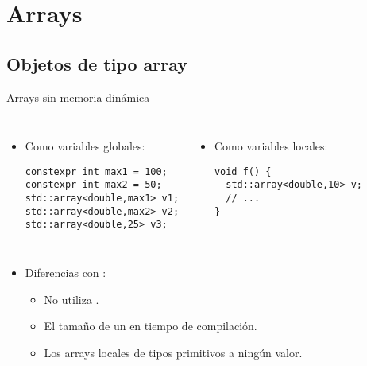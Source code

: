 \section{Arrays}

\subsection{Objetos de tipo array}

\begin{frame}[t,fragile]{Arrays sin memoria dinámica}
\begin{columns}[T]
\begin{itemize}
  \item Como variables globales:
\begin{lstlisting}
constexpr int max1 = 100;
constexpr int max2 = 50;
std::array<double,max1> v1;
std::array<double,max2> v2;
std::array<double,25> v3;
\end{lstlisting}
\end{itemize}

\begin{itemize}
  \item Como variables locales:
\begin{lstlisting}
void f() {
  std::array<double,10> v;
  // ...
}
\end{lstlisting}
\end{itemize}

\end{columns}

\begin{itemize}
  \item Diferencias con :
    \begin{itemize}
      \item No utiliza .
      \item El tamaño de un   en tiempo de 
            compilación.
      \item Los arrays locales de tipos primitivos  a ningún valor.
    \end{itemize}
\end{itemize}
\end{frame}


